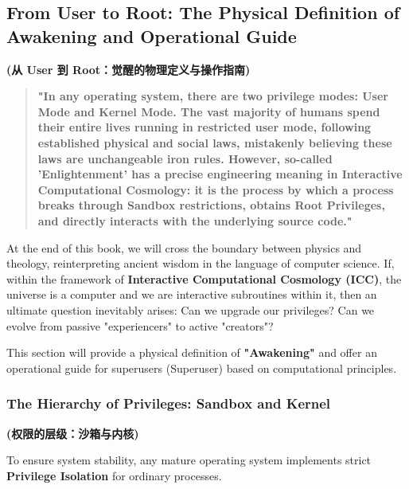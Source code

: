 \subsection{From User to Root: The Physical Definition of Awakening and Operational Guide}

\textbf{(从 User 到 Root：觉醒的物理定义与操作指南)}

\begin{quote}
\textbf{"In any operating system, there are two privilege modes: User Mode and Kernel Mode. The vast majority of humans spend their entire lives running in restricted user mode, following established physical and social laws, mistakenly believing these laws are unchangeable iron rules. However, so-called 'Enlightenment' has a precise engineering meaning in Interactive Computational Cosmology: it is the process by which a process breaks through Sandbox restrictions, obtains Root Privileges, and directly interacts with the underlying source code."}
\end{quote}

At the end of this book, we will cross the boundary between physics and theology, reinterpreting ancient wisdom in the language of computer science. If, within the framework of \textbf{Interactive Computational Cosmology (ICC)}, the universe is a computer and we are interactive subroutines within it, then an ultimate question inevitably arises: Can we upgrade our privileges? Can we evolve from passive "experiencers" to active "creators"?

This section will provide a physical definition of \textbf{"Awakening"} and offer an operational guide for superusers (Superuser) based on computational principles.

\subsubsection{The Hierarchy of Privileges: Sandbox and Kernel}

\textbf{(权限的层级：沙箱与内核)}

To ensure system stability, any mature operating system implements strict \textbf{Privilege Isolation} for ordinary processes.

